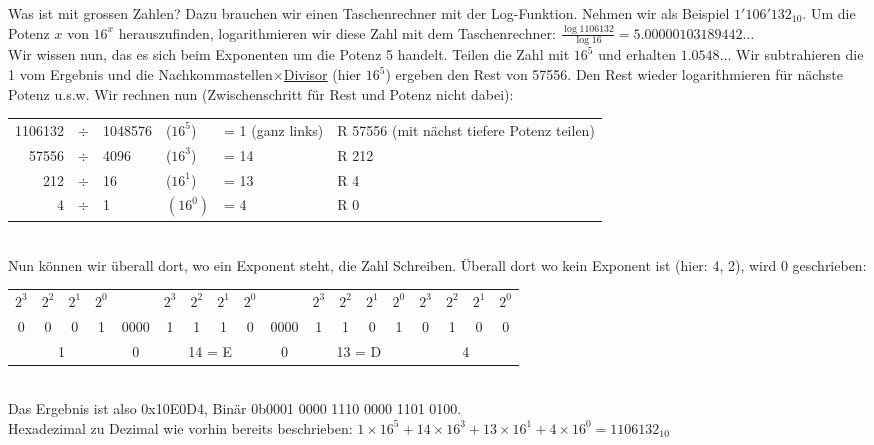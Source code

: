Was ist mit grossen Zahlen? Dazu brauchen wir einen Taschenrechner mit der Log-Funktion. Nehmen wir als Beispiel $1'106'132_{10}$. Um die Potenz $x$ von $16^x$ herauszufinden, logarithmieren wir diese Zahl mit dem Taschenrechner: $\frac{\log{1106132}}{\log{16}}=5.00000103189442\dots$ \\
Wir wissen nun, das es sich beim Exponenten um die Potenz 5 handelt. Teilen die Zahl mit $16^5$ und erhalten $1.0548\dots$ Wir subtrahieren die 1 vom Ergebnis und die Nachkommastellen$\times$\underline{Divisor} (hier $16^5$) ergeben den Rest von 57556. Den Rest wieder logarithmieren für nächste Potenz u.s.w. Wir rechnen nun (Zwischenschritt für Rest und Potenz nicht dabei):\\
\begin{tabular}{rcllll}
    1106132&$\div$&1048576&($16^5$)&= 1 (ganz links)&R 57556 (mit nächst tiefere Potenz teilen)\\
    57556&$\div$&4096&($16^3$)&= 14&R 212\\
    212&$\div$&16&($16^1$)&= 13&R 4\\
    4&$\div$&1&$(16^0)$&= 4&R 0\\[1em]
\end{tabular}\\

Nun können wir überall dort, wo ein Exponent steht, die Zahl Schreiben. Überall dort wo kein Exponent ist (hier: 4, 2), wird 0 geschrieben:\\
\begin{tabular}{cccc|c|cccc|c|cccc|cccc}
    $2^3$&$2^2$&$2^1$&$2^0$&&$2^3$&$2^2$&$2^1$&$2^0$&&$2^3$&$2^2$&$2^1$&$2^0$&$2^3$&$2^2$&$2^1$&$2^0$\\
    0&0&0&1&0000&1&1&1&0&0000&1&1&0&1&0&1&0&0\\
    \hline
    \multicolumn{4}{c|}{1}&\multicolumn{1}{c|}{0}&\multicolumn{4}{c|}{14 = E}&\multicolumn{1}{c|}{0}&\multicolumn{4}{c|}{13 = D}&\multicolumn{4}{c}{4}\\
\end{tabular}\\[1em]
Das Ergebnis ist also 0x10E0D4, Binär 0b0001 0000 1110 0000 1101 0100.\\[1em]
Hexadezimal zu Dezimal wie vorhin bereits beschrieben: $1\times16^5+14\times16^3+13\times16^1+4\times16^0=1106132_{10}$
